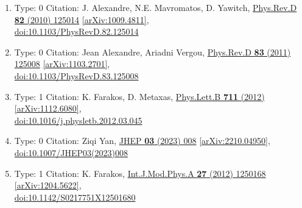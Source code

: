 \documentclass[a4paper,10pt]{article}
\begin{document}
\begin{enumerate}
\begin{enumerate}
  \item Type: 0 Citation: J. Alexandre, N.E. Mavromatos, D. Yawitch, \href{https://www.doi.org/10.1103/PhysRevD.82.125014}{Phys.Rev.D {\bf 82} (2010) 125014}  \href{https://arxiv.org/abs/1009.4811}{[arXiv:1009.4811]},\\\href{https://www.doi.org/10.1103/PhysRevD.82.125014}{doi:10.1103/PhysRevD.82.125014}
  \item Type: 0 Citation: Jean Alexandre, Ariadni Vergou, \href{https://www.doi.org/10.1103/PhysRevD.83.125008}{Phys.Rev.D {\bf 83} (2011) 125008}  \href{https://arxiv.org/abs/1103.2701}{[arXiv:1103.2701]},\\\href{https://www.doi.org/10.1103/PhysRevD.83.125008}{doi:10.1103/PhysRevD.83.125008}
  \item Type: 1 Citation: K. Farakos, D. Metaxas, \href{https://www.doi.org/10.1016/j.physletb.2012.03.045}{Phys.Lett.B {\bf 711} (2012) }  \href{https://arxiv.org/abs/1112.6080}{[arXiv:1112.6080]},\\\href{https://www.doi.org/10.1016/j.physletb.2012.03.045}{doi:10.1016/j.physletb.2012.03.045}
  \item Type: 0 Citation: Ziqi Yan, \href{https://www.doi.org/10.1007/JHEP03(2023)008}{JHEP {\bf 03} (2023) 008}  \href{https://arxiv.org/abs/2210.04950}{[arXiv:2210.04950]},\\\href{https://www.doi.org/10.1007/JHEP03(2023)008}{doi:10.1007/JHEP03(2023)008}
  \item Type: 1 Citation: K. Farakos, \href{https://www.doi.org/10.1142/S0217751X12501680}{Int.J.Mod.Phys.A {\bf 27} (2012) 1250168}  \href{https://arxiv.org/abs/1204.5622}{[arXiv:1204.5622]},\\\href{https://www.doi.org/10.1142/S0217751X12501680}{doi:10.1142/S0217751X12501680}

\end{enumerate}
\end{enumerate}
\end{document}
